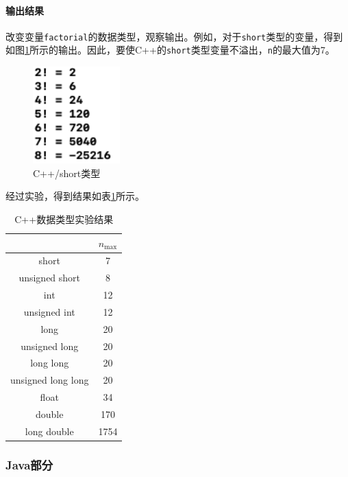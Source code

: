 \documentclass[11pt]{homework}
\begin{document}
\paragraph{输出结果}
改变变量\verb|factorial|的数据类型，观察输出。例如，对于\verb|short|类型的变量，得到如图\ref{cpp_short}所示的输出。因此，要使C++的\verb|short|类型变量不溢出，\verb|n|的最大值为7。
\begin{figure}
  \centering
  \includegraphics[width=0.3\textwidth]{cpp_short}
  \caption{C++/short类型}
  \label{cpp_short}
\end{figure}

经过实验，得到结果如表\ref{cpp_result}所示。
\begin{table}[]
  \centering
  \begin{tabular}{|c|c|}
  \hline
                     & $n_{\max}$ \\ \hline
  short              & 7          \\ \hline
  unsigned short     & 8          \\ \hline
  int                & 12         \\ \hline
  unsigned int       & 12         \\ \hline
  long               & 20         \\ \hline
  unsigned long      & 20         \\ \hline
  long long          & 20         \\ \hline
  unsigned long long & 20         \\ \hline
  float              & 34         \\ \hline
  double             & 170        \\ \hline
  long double        & 1754       \\ \hline
  \end{tabular}
  \caption{C++数据类型实验结果}
  \label{cpp_result}
\end{table}

\subsubsection*{Java部分}
\end{document}
